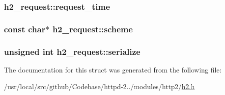 \subsubsection[{\texorpdfstring{request\+\_\+time}{request_time}}]{ h2\+\_\+request\+::request\+\_\+time}\hypertarget{structh2__request_adaa05fcdc45ee82f557ae390d1e14f1a}{}\label{structh2__request_adaa05fcdc45ee82f557ae390d1e14f1a}
\subsubsection[{\texorpdfstring{scheme}{scheme}}]{\setlength{\rightskip}{0pt plus 5cm}const char$\ast$ h2\+\_\+request\+::scheme}\hypertarget{structh2__request_a601afd08b5f27bf7920ea62e8d97ffd7}{}\label{structh2__request_a601afd08b5f27bf7920ea62e8d97ffd7}
\subsubsection[{\texorpdfstring{serialize}{serialize}}]{\setlength{\rightskip}{0pt plus 5cm}unsigned {\bf int} h2\+\_\+request\+::serialize}\hypertarget{structh2__request_acb093d2b49d76dc171a6796b59ba7fdb}{}\label{structh2__request_acb093d2b49d76dc171a6796b59ba7fdb}


The documentation for this struct was generated from the following file\+:\begin{DoxyCompactItemize}
\item 
/usr/local/src/github/\+Codebase/httpd-\/2../modules/http2/\hyperlink{h2_8h}{h2.\+h}\end{DoxyCompactItemize}
